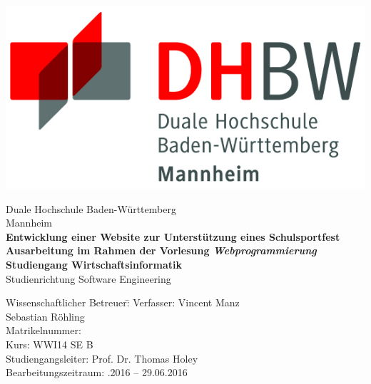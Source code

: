 \begin{titlepage}
	\begin{minipage}{\textwidth}
		\vspace{-2cm}
		\noindent \hfill   \includegraphics{img/logo.jpg}
	\end{minipage}
	\vspace{1em}
	\sffamily
	\begin{center}
		\textsf{\large{}Duale Hochschule Baden-W\"urttemberg\\[1.5mm] Mannheim}\\[2em]
		\textsf{\textbf{\Large{}Entwicklung einer Website zur Unterstützung eines Schulsportfest}}\\[3mm]
		\textsf{\textbf{Ausarbeitung im Rahmen der Vorlesung \textit{Webprogrammierung}}} \\[1.5cm]
		\textsf{\textbf{\Large{}Studiengang Wirtschaftsinformatik}\\[3mm] \textsf{Studienrichtung Software Engineering}}
		
		\vspace{3em}
		\vfill
		
		\begin{minipage}{\textwidth}
			
			\begin{tabbing}
				Wissenschaftlicher Betreuer:\hspace{0.85cm}\=\kill
				Verfasser: \>Vincent Manz \\[1mm]
				\>Sebastian Röhling \\[1mm]
				Matrikelnummer:  \\[1mm]
				Kurs: \> WWI14 SE B \\[1mm]
				Studiengangsleiter: \> Prof. Dr. Thomas Holey  \\[1mm]
				Bearbeitungszeitraum: .2016 -- 29.06.2016
			\end{tabbing}
		\end{minipage}
		
	\end{center}
	
\end{titlepage}